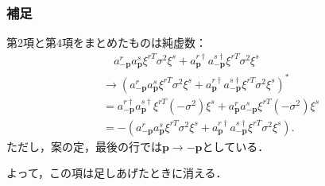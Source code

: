 \documentclass[pdflatex,unicode,ja=standard,12pt]{beamer}
\begin{document}
\begin{frame}[noframenumbering]
  
  \frametitle{補足\ \subsecname}
  \thispagestyle{empty}

  第2項と第4項をまとめたものは純虚数：
  \begin{align}
    &\quad
    a_{-\mathbf{p}}^ra_{\mathbf{p}}^s
    \xi^{rT}
    \sigma^2
    \xi^s
    +
    a_{\mathbf{p}}^{r\dag}a_{-\mathbf{p}}^{s\dag}
    \xi^{rT}\sigma^2\xi^s
    \nonumber
    \\
    &\rightarrow
    (
      a_{-\mathbf{p}}^ra_{\mathbf{p}}^s
      \xi^{rT}
      \sigma^2
      \xi^s
      +
      a_{\mathbf{p}}^{r\dag}a_{-\mathbf{p}}^{s\dag}
      \xi^{rT}\sigma^2\xi^s
    )^*
    \nonumber
    \\
    &=
    a_{-\mathbf{p}}^{r\dag}a_{\mathbf{p}}^{s\dag}
    \xi^{rT}
    (-\sigma^2)
    \xi^s
    +
    a_{\mathbf{p}}^{r}a_{-\mathbf{p}}^{s}
    \xi^{rT}
    (-\sigma^2)
    \xi^s
    \nonumber
    \\
    &=
    -(
      a_{-\mathbf{p}}^ra_{\mathbf{p}}^s
      \xi^{rT}
      \sigma^2
      \xi^s
      +
      a_{\mathbf{p}}^{r\dag}a_{-\mathbf{p}}^{s\dag}
      \xi^{rT}\sigma^2\xi^s
    )
    .
  \end{align}
  ただし，案の定，最後の行では$\mathbf{p}\rightarrow-\mathbf{p}$としている．

  \vspace{10pt}

  よって，この項は足しあげたときに消える．

\end{frame}
\end{document}
